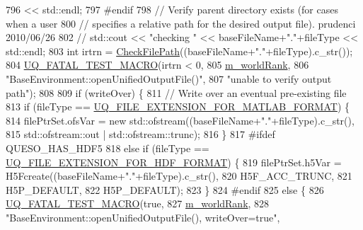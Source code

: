 \begin{DoxyCode}
796                 << std::endl;
797 \textcolor{preprocessor}{#endif}
798 \textcolor{preprocessor}{}      \textcolor{comment}{// Verify parent directory exists (for cases when a user}
800       \textcolor{comment}{// specifies a relative path for the desired output file). prudenci 2010/06/26}
802 \textcolor{comment}{}      \textcolor{comment}{// std::cout << "checking " << baseFileName+"."+fileType << std::endl;}
803       \textcolor{keywordtype}{int} irtrn = \hyperlink{namespace_q_u_e_s_o_abc55c11f68bb99c4eba88030f1164764}{CheckFilePath}((baseFileName+\textcolor{stringliteral}{"."}+fileType).c\_str());
804       \hyperlink{_defines_8h_a56d63d18d0a6d45757de47fcc06f574d}{UQ\_FATAL\_TEST\_MACRO}(irtrn < 0,
805                           \hyperlink{class_q_u_e_s_o_1_1_base_environment_a464cab923ada0e14c6e3a4000c2ea385}{m\_worldRank},
806                           \textcolor{stringliteral}{"BaseEnvironment::openUnifiedOutputFile()"},
807                           \textcolor{stringliteral}{"unable to verify output path"});
808 
809       \textcolor{keywordflow}{if} (writeOver) \{
811         \textcolor{comment}{// Write over an eventual pre-existing file}
813 \textcolor{comment}{}        \textcolor{keywordflow}{if} (fileType == \hyperlink{_defines_8h_ac440026eff7deb1c1eed1eea0e8e36ba}{UQ\_FILE\_EXTENSION\_FOR\_MATLAB\_FORMAT}) \{
814           filePtrSet.ofsVar = \textcolor{keyword}{new} std::ofstream((baseFileName+\textcolor{stringliteral}{"."}+fileType).c\_str(),
815                                                 std::ofstream::out | std::ofstream::trunc);
816         \}
817 \textcolor{preprocessor}{#ifdef QUESO\_HAS\_HDF5}
818 \textcolor{preprocessor}{}        \textcolor{keywordflow}{else} \textcolor{keywordflow}{if} (fileType == \hyperlink{_defines_8h_a4ebcc075277d031eb97c90b9a45f4493}{UQ\_FILE\_EXTENSION\_FOR\_HDF\_FORMAT}) \{
819           filePtrSet.h5Var = H5Fcreate((baseFileName+\textcolor{stringliteral}{"."}+fileType).c\_str(),
820                                        H5F\_ACC\_TRUNC,
821                                        H5P\_DEFAULT,
822                                        H5P\_DEFAULT);
823         \}
824 \textcolor{preprocessor}{#endif}
825 \textcolor{preprocessor}{}        \textcolor{keywordflow}{else} \{
826           \hyperlink{_defines_8h_a56d63d18d0a6d45757de47fcc06f574d}{UQ\_FATAL\_TEST\_MACRO}(\textcolor{keyword}{true},
827                               \hyperlink{class_q_u_e_s_o_1_1_base_environment_a464cab923ada0e14c6e3a4000c2ea385}{m\_worldRank},
828                               \textcolor{stringliteral}{"BaseEnvironment::openUnifiedOutputFile(), writeOver=true"},

\end{DoxyCode}
